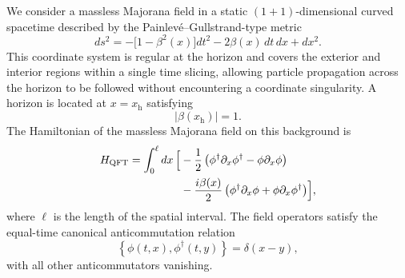 \documentclass[reprint,amsmath,amssymb,aps,showkeys,superscriptaddress]{revtex4-2}
\begin{document}
We consider a massless Majorana field in a static
$(1+1)$-dimensional curved spacetime described by the
Painlev\'e--Gullstrand-type metric
\begin{equation}
  ds^2
  =
  -\bigl[1-\beta^2(x)\bigr]dt^2
  -2\beta(x)\,dt\,dx
  +dx^2.
  \label{eq:PG_metric}
\end{equation}
This coordinate system is regular at the horizon and covers the
exterior and interior regions within a single time slicing, allowing
particle propagation across the horizon to be followed without
encountering a coordinate singularity. A horizon is located at
$x=x_{\mathrm h}$ satisfying
\begin{equation}
  \bigl|\beta(x_{\mathrm h})\bigr|=1.
  \label{eq:horizon_condition}
\end{equation}
The Hamiltonian of the massless Majorana field on this background is
\begin{equation}
\begin{aligned}
  H_{\mathrm{QFT}}
  =
  \int_0^\ell dx\,
  \Bigl[
  &-\frac{1}{2}
  \left(
    \phi^\dagger\partial_x\phi^\dagger
    -
    \phi\partial_x\phi
  \right)
  \\
  &-\frac{i\beta(x)}{2}
  \left(
    \phi^\dagger\partial_x\phi
    +
    \phi\partial_x\phi^\dagger
  \right)
  \Bigr],
\end{aligned}
  \label{eq:continuum_Hamiltonian}
\end{equation}
where $\ell$ is the length of the spatial interval. The field
operators satisfy the equal-time canonical anticommutation relation
\begin{equation}
  \left\{
    \phi(t,x),\phi^{\dagger}(t,y)
  \right\}
  =
  \delta(x-y),
\label{eq:continuum_anticommutation}
\end{equation}
with all other anticommutators vanishing.
\end{document}
